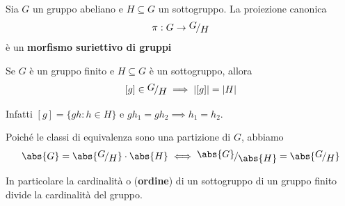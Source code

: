\documentclass[../main.tex]{subfiles}
\begin{document}
\begin{proposition}
    Sia $G$ un gruppo abeliano e $H \subseteq G$ un sottogruppo. La proiezione canonica
    \[
        \pi : G \rightarrow \nicefrac{G}{H}
    \]
    è un \textbf{morfismo suriettivo di gruppi}
\end{proposition}

Se $G$ è un gruppo finito e $H \subseteq G$ è un sottogruppo, allora
\[
    [g] \in \nicefrac{G}{H} \implies |[g]| = |H|
\]

Infatti $[g] = \{gh : h \in  H\}$ e $gh_1 = gh_2 \implies h_1 = h_2$.

Poiché le classi di equivalenza sono una partizione di $G$, abbiamo
\[
    \abs{G} = \abs{\nicefrac{G}{H}} \cdot \abs{H} \iff \nicefrac{\abs{G}}{\abs{H}} = \abs{\nicefrac{G}{H}}
\]

In particolare la cardinalità o (\textbf{ordine}) di un sottogruppo di un gruppo finito divide la cardinalità del gruppo.
\end{document}
